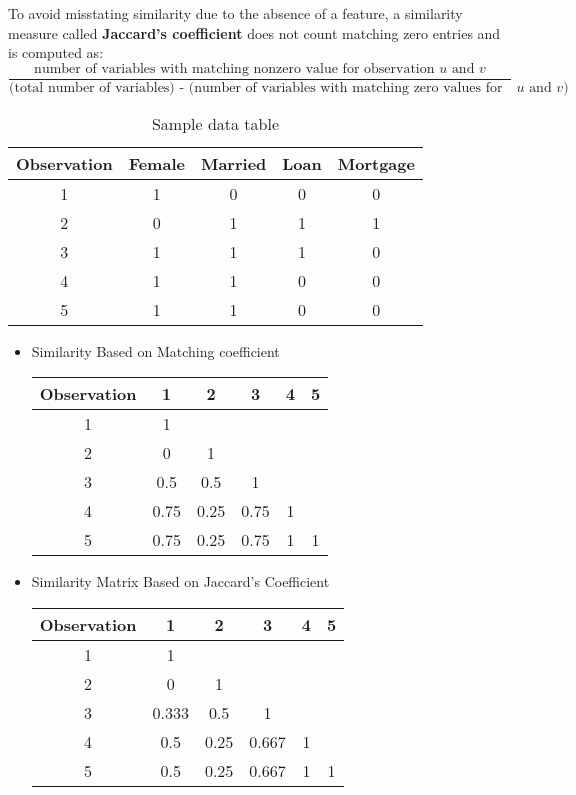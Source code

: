 \documentclass{report}
\begin{document}
\noindent To avoid misstating similarity due to the absence of a feature, a similarity measure called \textbf{Jaccard's coefficient} does not count matching zero entries and is computed as:
$$\frac{\text{number of variables with matching nonzero value for observation $u$ and $v$}}{(\text{total number of variables) - (number of variables with matching zero values for observations $u$ and $v$)}}$$
\bigbreak \noindent
\begin{table}[ht]
\centering
\begin{tabular}{ccccc}
\toprule
Observation & Female & Married & Loan & Mortgage \\
\midrule
1 & 1 & 0 & 0 & 0 \\
2 & 0 & 1 & 1 & 1 \\
3 & 1 & 1 & 1 & 0 \\
4 & 1 & 1 & 0 & 0 \\
5 & 1 & 1 & 0 & 0 \\
\bottomrule
\end{tabular}
\caption{Sample data table}
\end{table}
\newpage
\begin{itemize}
  \item Similarity Based on Matching coefficient 
\begin{table}[ht]
\centering
\begin{tabular}{cccccc}
\toprule
Observation & 1 & 2 & 3 & 4 & 5 \\
\midrule
1 & 1 &  &  &  &  \\
2 & 0 & 1 &  &  &  \\
3 & 0.5 & 0.5 & 1 &  &  \\
4 & 0.75 & 0.25 & 0.75 & 1 &  \\
5 & 0.75 & 0.25 & 0.75 & 1 & 1 \\
\bottomrule
\end{tabular}
\end{table}
\item Similarity Matrix Based on Jaccard's Coefficient
\begin{table}[ht]
\centering
\begin{tabular}{cccccc}
\toprule
Observation & 1 & 2 & 3 & 4 & 5 \\
\midrule
1 & 1 &  &  &  &  \\
2 & 0 & 1 &  &  &  \\
3 & 0.333 & 0.5 & 1 &  &  \\
4 & 0.5 & 0.25 & 0.667 & 1 &  \\
5 & 0.5 & 0.25 & 0.667 & 1 & 1 \\
\bottomrule
\end{tabular}
\end{table}
\end{itemize}
\end{document}
